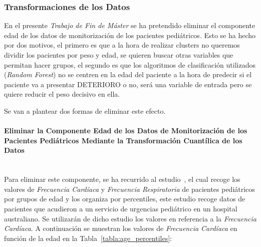 \subsubsection{Transformaciones de los Datos}\label{sec:transformaciones-de-datos}

En el presente \textit{Trabajo de Fin de Máster} se ha pretendido eliminar el componente edad de los datos de monitorización de los pacientes pediátricos. Esto se ha hecho por dos motivos, el primero es que a la hora de realizar clusters no queremos dividir los pacientes por peso y edad, se quieren buscar otras variables que permitan hacer grupos, el segundo es que los algoritmos de clasificación utilizados (\textit{Random Forest}) no se centren en la edad del paciente a la hora de predecir si el paciente va a presentar DETERIORO o no, será una variable de entrada pero se quiere reducir el peso decisivo en ella.

Se van a plantear dos formas de eliminar este efecto.

\paragraph{Eliminar la Componente Edad de los Datos de Monitorización de los Pacientes Pediátricos Mediante la Transformación Cuantílica de los Datos}\label{sec:eliminar-edad-1} \\

Para eliminar este componente, se ha recurrido al estudio~\cite{percentilesFenton2015}, el cual recoge los valores de \textit{Frecuencia Cardíaca} y \textit{Frecuencia Respiratoria}  de pacientes pediátricos por grupos de edad y los organiza por percentiles, este estudio recoge datos de pacientes que acudieron a un servicio de urgencias pediátrico en un hospital australiano. Se utilizarán de dicho estudio los valores en referencia a la \textit{Frecuencia Cardíaca}. A continuación se muestran los valores de \textit{Frecuencia Cardíaca} en función de la edad en la Tabla~\ref{tabla:age_percentiles}:

